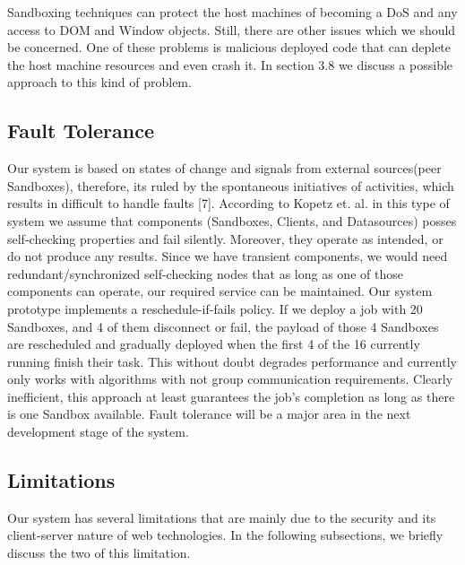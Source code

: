\documentclass[10pt,reprint]{socc14}
\begin{document}
Sandboxing techniques can protect the host machines of becoming a DoS and any access to DOM and Window objects. Still, there are other issues which we should be concerned. One of these problems is malicious deployed code that can deplete the host machine resources and even crash it. In section 3.8 we discuss a possible approach to this kind of problem.


\subsection{Fault Tolerance}
Our system is based on states of change and signals from external sources(peer Sandboxes), therefore, its ruled by the spontaneous initiatives of activities, which results in difficult to handle faults [7]. According to Kopetz et. al. in this type of system we assume that components (Sandboxes, Clients, and Datasources) posses self-checking properties and fail silently. Moreover, they operate as intended, or do not produce any results. Since we have transient components, we would need redundant/synchronized self-checking nodes that as long as one of those components can operate, our required service can be maintained. Our system prototype implements a reschedule-if-fails policy. If we deploy a job with 20 Sandboxes, and 4 of them disconnect or fail, the payload of those 4 Sandboxes are rescheduled and gradually deployed when the first 4 of the 16 currently running finish their task. This without doubt degrades performance and currently only works with algorithms with not group communication requirements. Clearly inefficient, this approach at least guarantees the job’s completion as long as there is one Sandbox available. Fault tolerance will be a major area in the next development stage of the system.



\subsection{Limitations}
Our system has several limitations that are mainly due to the security and its client-server nature of web technologies. In the following subsections, we briefly discuss the two of this limitation.
\end{document}
